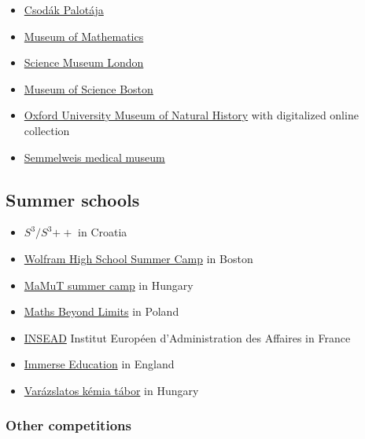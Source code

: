 \documentclass{article}
\begin{document}
\begin{itemize}
    \item \href{https://www.csopa.hu/}{Csodák Palotája}
    \item \href{https://momath.org/}{Museum of Mathematics}
    \item \href{https://www.sciencemuseum.org.uk/home}{Science Museum London}
    \item \href{https://www.mos.org/}{Museum of Science Boston}
    \item \href{https://oumnh.ox.ac.uk/}{Oxford University Museum of Natural History} with digitalized online collection
    
    \item \href{http://semmelweismuseum.hu/}{Semmelweis medical museum}
\end{itemize}

\subsection{Summer schools}

\begin{itemize}
    \item \href{http://drustvo-evo.hr/s3/}{$S^3/S^3{\mathrm{++}}$} in Croatia
    \item \href{https://education.wolfram.com/summer-camp/}{Wolfram High School Summer Camp} in Boston
    \item \href{https://en.agondolkodasorome.hu/summercamps/#}{MaMuT summer camp} in Hungary
    \item \href{https://mathsbeyondlimits.eu/}{Maths Beyond Limits} in Poland
    \item \href{https://www.insead.edu/summer-at-insead}{INSEAD} Institut Européen d'Administration des Affaires in France
    \item \href{https://www.immerse.education/}{Immerse Education} in England
    \item \href{https://www.varazslatos-kemia-tabor.mke.org.hu/}{Varázslatos kémia tábor} in Hungary
\end{itemize}

\subsubsection{Other competitions}
\end{document}
